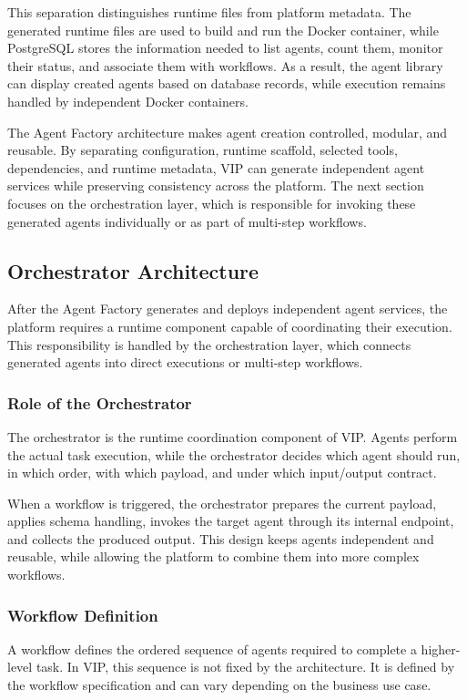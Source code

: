 This separation distinguishes runtime files from platform metadata. The generated runtime files are used to build and run the Docker container, while PostgreSQL stores the information needed to list agents, count them, monitor their status, and associate them with workflows. As a result, the agent library can display created agents based on database records, while execution remains handled by independent Docker containers.

The Agent Factory architecture makes agent creation controlled, modular, and reusable. By separating configuration, runtime scaffold, selected tools, dependencies, and runtime metadata, VIP can generate independent agent services while preserving consistency across the platform. The next section focuses on the orchestration layer, which is responsible for invoking these generated agents individually or as part of multi-step workflows.
\subsection{Orchestrator Architecture}

After the Agent Factory generates and deploys independent agent services, the platform requires a runtime component capable of coordinating their execution. This responsibility is handled by the orchestration layer, which connects generated agents into direct executions or multi-step workflows.

\subsubsection{Role of the Orchestrator}

The orchestrator is the runtime coordination component of VIP. Agents perform the actual task execution, while the orchestrator decides which agent should run, in which order, with which payload, and under which input/output contract.

When a workflow is triggered, the orchestrator prepares the current payload, applies schema handling, invokes the target agent through its internal endpoint, and collects the produced output. This design keeps agents independent and reusable, while allowing the platform to combine them into more complex workflows.

\subsubsection{Workflow Definition}

A workflow defines the ordered sequence of agents required to complete a higher-level task. In VIP, this sequence is not fixed by the architecture. It is defined by the workflow specification and can vary depending on the business use case.

